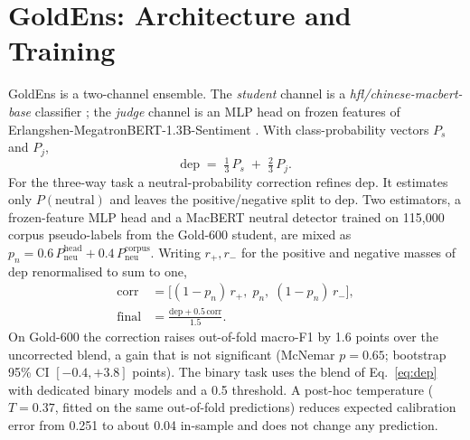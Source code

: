 
\appendix

\section{GoldEns: Architecture and Training}
\label{app:goldens}

GoldEns is a two-channel ensemble. The \emph{student} channel is a
\emph{hfl/chinese-macbert-base} classifier \citep{cui2020macbert}; the
\emph{judge} channel is an MLP head on frozen features of
Erlangshen-MegatronBERT-1.3B-Sentiment \citep{fengshenbang2022}. With
class-probability vectors $P_s$ and $P_j$,
\begin{equation}
  \mathrm{dep} \;=\; \tfrac{1}{3}\,P_s \;+\; \tfrac{2}{3}\,P_j .
  \label{eq:dep}
\end{equation}
For the three-way task a neutral-probability correction refines
$\mathrm{dep}$. It estimates only $P(\text{neutral})$ and leaves the
positive/negative split to $\mathrm{dep}$. Two estimators, a
frozen-feature MLP head and a MacBERT neutral detector trained on
115{,}000 corpus pseudo-labels from the Gold-600 student, are mixed
as $p_n = 0.6\,P_{\mathrm{neu}}^{\mathrm{head}} +
0.4\,P_{\mathrm{neu}}^{\mathrm{corpus}}$. Writing $r_{+}, r_{-}$ for
the positive and negative masses of $\mathrm{dep}$ renormalised to
sum to one,
\begin{equation}
  \begin{aligned}
    \mathrm{corr} &= \big[(1-p_n)\,r_{+},\; p_n,\; (1-p_n)\,r_{-}\big],\\
    \mathrm{final} &= \frac{\mathrm{dep} + 0.5\,\mathrm{corr}}{1.5}.
  \end{aligned}
  \label{eq:spec}
\end{equation}
On Gold-600 the correction raises out-of-fold macro-F1 by 1.6 points
over the uncorrected blend, a gain that is not significant (McNemar
$p{=}0.65$; bootstrap 95\% CI $[-0.4,+3.8]$ points). The binary task
uses the blend of Eq.~\ref{eq:dep} with dedicated binary models and a
0.5 threshold. A post-hoc temperature ($T{=}0.37$, fitted on the same
out-of-fold predictions) reduces expected calibration error from
0.251 to about 0.04 in-sample and does not change any prediction.


